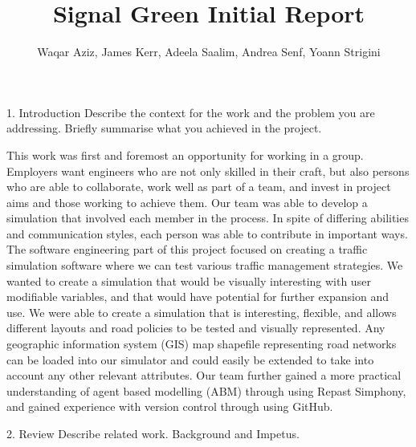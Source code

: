 \documentclass[11pt]{article}
\begin{document}
\title{Signal Green Initial Report}

\author{Waqar Aziz, James Kerr, Adeela Saalim, Andrea Senf, Yoann Strigini}

\maketitle 
\section*{}





1. Introduction Describe the context for the work and the problem you are addressing. Briefly summarise what you achieved in the project.

This work was first and foremost an opportunity for working in a group. Employers want engineers who are not only skilled in their craft, but also persons who are able to collaborate, work well as part of a team, and invest in project aims and those working to achieve them. Our team was able to develop a simulation that involved each member in the process. In spite of differing abilities and communication styles, each person was able to contribute in important ways.
The software engineering part of this project focused on creating a traffic simulation software where we can test various traffic management strategies. We wanted to create a simulation that would be visually interesting with user modifiable variables, and that would have potential for further expansion and use.
We were able to create a simulation that is interesting, flexible, and allows different layouts and road policies to be tested and visually represented. Any geographic information system (GIS) map shapefile representing road networks can be loaded into our simulator and could easily be extended to take into account any other relevant attributes.
Our team further gained a more practical understanding of agent based modelling (ABM) through using Repast Simphony, and gained experience with version control through using GitHub.


2. Review Describe related work. Background and Impetus. 
\end{document}
